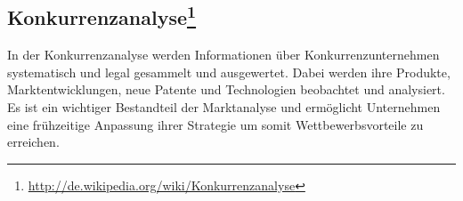 \subsection[Konkurrenzanalyse]{Konkurrenzanalyse\footnote{\url{http://de.wikipedia.org/wiki/Konkurrenzanalyse}}}
In der Konkurrenzanalyse werden Informationen über Konkurrenzunter\-nehmen systematisch und legal gesammelt und ausgewertet. Dabei werden ihre Produkte, Marktentwicklungen, neue Patente und Technologien beobachtet und analysiert. Es ist ein wichtiger Bestandteil der Marktanalyse und ermöglicht Unternehmen eine frühzeitige Anpassung ihrer Strategie um somit Wettbewerbsvorteile zu erreichen.
